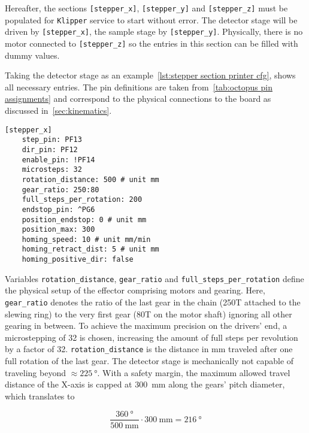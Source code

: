         Hereafter, the sections \texttt{[stepper\_x]}, \texttt{[stepper\_y]} and \texttt{[stepper\_z]} must be populated for \texttt{Klipper} service to start without error.
        The detector stage will be driven by \texttt{[stepper\_x]}, the sample stage by \texttt{[stepper\_y]}.
        Physically, there is no motor connected to \texttt{[stepper\_z]} so the entries in this section can be filled with dummy values.

        Taking the detector stage as an example~\cref{lst:stepper section printer cfg}, shows all necessary entries.
        The pin definitions are taken from~\cref{tab:octopus pin assignments} and correspond to the physical connections to the board as discussed in~\cref{sec:kinematics}.

        \begin{lstlisting}[style=mydjango, firstnumber=16,
            caption={[Example stepper section of \texttt{printer.cfg}]Example stepper section of \texttt{printer.cfg}.},
            label={lst:stepper section printer cfg}%
            ]
    [stepper_x]
    step_pin: PF13
    dir_pin: PF12
    enable_pin: !PF14
    microsteps: 32
    rotation_distance: 500 # unit mm
    gear_ratio: 250:80
    full_steps_per_rotation: 200
    endstop_pin: ^PG6
    position_endstop: 0 # unit mm
    position_max: 300
    homing_speed: 10 # unit mm/min
    homing_retract_dist: 5 # unit mm
    homing_positive_dir: false
        \end{lstlisting}

        Variables \texttt{rotation\_distance}, \texttt{gear\_ratio} and \texttt{full\_steps\_per\_rotation} define the physical setup of the effector comprising motors and gearing.
        Here, \texttt{gear\_ratio} denotes the ratio of the last gear in the chain (250T attached to the slewing ring) to the very first gear (80T on the motor shaft) ignoring all other gearing in between.
        To achieve the maximum precision on the drivers' end, a microstepping of 32 is chosen, increasing the amount of full steps per revolution by a factor of 32.
        \texttt{rotation\_distance} is the distance in \unit{\milli\meter} traveled after one full rotation of the last gear.
        The detector stage is mechanically not capable of traveling beyond \(\approx \qty{225}{\degree}\).
        With a safety margin, the maximum allowed travel distance of the X-axis is capped at \qty{300}{\milli\metre} along the gears' pitch diameter, which translates to

        \begin{equation}
            \frac{\qty{360}{\degree}}{\qty{500}{\milli\metre}} \cdot \qty{300}{\milli\metre} = \qty{216}{\degree}
            \label{eq:position max}
        \end{equation}
        
